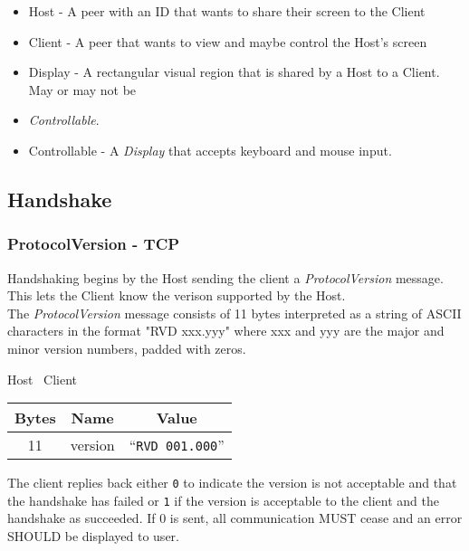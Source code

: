 \documentclass{article}
\begin{document}
    \begin{itemize}
        \item Host - A peer with an ID that wants to share their screen to the Client
        \item Client - A peer that wants to view and maybe control the Host's screen
        \item Display - A rectangular visual region that is shared by a Host to a Client. May or may not be
        \item \emph{Controllable}.
        \item Controllable - A \emph{Display} that accepts keyboard and mouse input.
    \end{itemize}

    \subsection{Handshake}

    \subsubsection{ProtocolVersion - TCP}
    Handshaking begins by the Host sending the client a \emph{ProtocolVersion} message. This lets the Client know the
    verison supported by the Host.\\

    The \emph{ProtocolVersion} message consists of 11 bytes interpreted as a string of ASCII characters in the format
    "RVD xxx.yyy" where xxx and yyy are the major and minor version numbers, padded with zeros.

    \begin{center}
        Host \textrightarrow\ Client\\
        \begin{tabular}{|c|c|c|}
            \hline
            \textbf{Bytes} & \textbf{Name} & \textbf{Value}           \\
            \hline
            11             & version       & ``\texttt{RVD 001.000}'' \\
            \hline
        \end{tabular}
    \end{center}

    The client replies back either \texttt{0} to indicate the version is not acceptable and that the handshake has
    failed or \texttt{1} if the version is acceptable to the client and the handshake as succeeded. If 0 is sent, all
    communication MUST cease and an error SHOULD be displayed to user.
\end{document}
